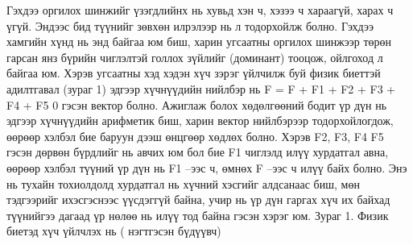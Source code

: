 Гэхдээ оргилох шинжийг үзэгдлийнх нь хувьд хэн ч, хэзээ ч хараагүй, харах ч үгүй. Эндээс бид түүнийг зөвхөн илрэлээр нь л тодорхойлж болно. Гэхдээ хамгийн хүнд нь энд байгаа юм биш, харин угсаатны оргилох шинжээр төрөн гарсан янз бүрийн чиглэлтэй голлох зүйлийг (доминант) тооцож, ойлгоход л байгаа юм. Хэрэв угсаатны хэд хэдэн хүч зэрэг үйлчилж буй физик биеттэй адилтгавал (зураг 1) эдгээр хүчнүүдийн нийлбэр нь F = F + F1 + F2 + F3 + F4 + F5 0 гэсэн вектор болно.
Ажиглаж болох хөдөлгөөний бодит үр дүн нь эдгээр хүчнүүдийн арифметик биш, харин вектор нийлбэрээр тодорхойлогдож, өөрөөр хэлбэл бие баруун дээш өнцгөөр хөдлөх болно. Хэрэв F2, F3, F4 F5 гэсэн дөрвөн бүрдлийг нь авчих юм бол бие F1 чиглэлд илүү хурдатгал авна, өөрөөр хэлбэл түүний үр дүн нь F1 –ээс ч, өмнөх F –ээс ч илүү байх болно. Энэ нь тухайн тохиолдолд хурдатгал нь хүчний хэсгийг алдсанаас биш, мөн тэдгээрийг ихэсгэснээс үүсдэггүй байна, учир нь үр дүн гаргах хүч их байхад түүнийгээ дагаад үр нөлөө нь илүү тод байна гэсэн хэрэг юм.
Зураг 1. Физик биетэд хүч үйлчлэх нь ( нэгтгэсэн бүдүүвч)

